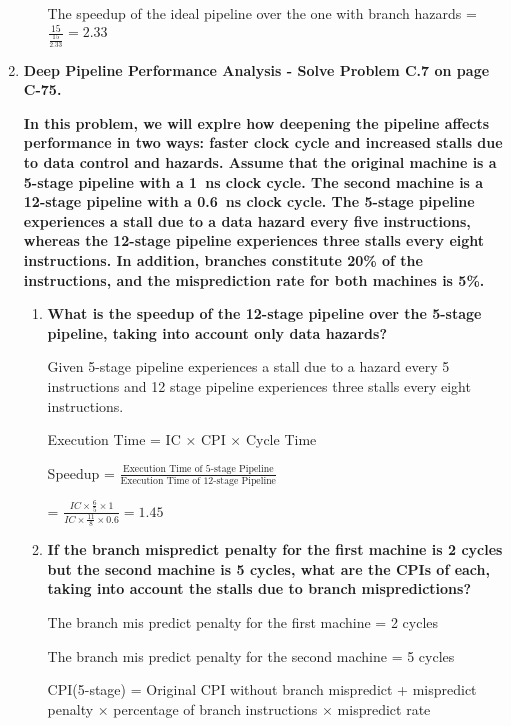\begin{enumerate}
\begin{enumerate}
        The speedup of the ideal pipeline over the one with branch hazards = $\frac{15}{\frac{15}{2.33}} = 2.33$
    \end{enumerate}
    
    \item \textbf{Deep Pipeline Performance Analysis - Solve Problem C.7 on page C-75.}
    
    \textbf{In this problem, we will explre how deepening the pipeline affects performance in two ways: faster clock cycle and increased stalls due to data control and hazards. Assume that the original machine is a 5-stage pipeline with a \SI{1}{ns} clock cycle. The second machine is a 12-stage pipeline with a \SI{0.6}{ns} clock cycle. The 5-stage pipeline experiences a stall due to a data hazard every five instructions, whereas the 12-stage pipeline experiences three stalls every eight instructions. In addition, branches constitute 20\% of the instructions, and the misprediction rate for both machines is 5\%.}
    
    \begin{enumerate}
        \item \textbf{What is the speedup of the 12-stage pipeline over the 5-stage pipeline, taking into account only data hazards?}
        
        Given 5-stage pipeline experiences a stall due to a hazard every 5 instructions and 12 stage pipeline experiences three stalls every eight instructions.
        
        Execution Time = IC × CPI × Cycle Time
        
        Speedup = $\frac{\text{Execution Time of 5-stage Pipeline}}{\text{Execution Time of 12-stage Pipeline}}$
        
        = $\frac{IC \times \frac{6}{5} \times 1}{IC \times \frac{11}{8} \times 0.6} = 1.45$
        
        \item \textbf{If the branch mispredict penalty for the first machine is 2 cycles but the second machine is 5 cycles, what are the CPIs of each, taking into account the stalls due to branch mispredictions?}
        
        The branch mis predict penalty for the first machine = 2 cycles
        
        The branch mis predict penalty for the second machine = 5 cycles
        
        CPI(5-stage) = Original CPI without branch mispredict + mispredict penalty × percentage of branch instructions × mispredict rate
        

\end{enumerate}
\end{enumerate}
